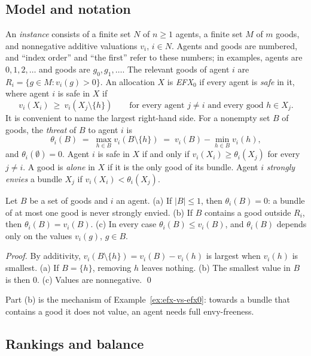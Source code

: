 \documentclass[runningheads,11pt]{llncs}
\newcommand{\efxz}{\texorpdfstring{\mbox{EFX$_0$}}{EFX0}}
\newcommand{\st}{\mathrel{:}}
\begin{document}
\subsection{Model and notation}\label{sec:model}

An \emph{instance} consists of a finite set $N$ of $n\ge1$ agents, a finite set $M$ of $m$ goods, and nonnegative additive valuations $v_i$, $i\in N$. Agents and goods are numbered, and ``index order'' and ``the first'' refer to these numbers; in examples, agents are $0,1,2,\dots$ and goods are $g_0,g_1,\dots$. The relevant goods of agent $i$ are $R_i=\{g\in M\st v_i(g)>0\}$. An allocation $X$ is \emph{\efxz{}} if every agent is \emph{safe} in it, where agent $i$ is safe in $X$ if
\[
  v_i(X_i)\ \ge\ v_i(X_j\setminus\{h\})\qquad\text{for every agent } j\ne i \text{ and every good } h\in X_j .
\]
It is convenient to name the largest right-hand side. For a nonempty set $B$ of goods, the \emph{threat} of $B$ to agent $i$ is
\[
  \theta_i(B)\;=\;\max_{h\in B} v_i(B\setminus\{h\})\;=\;v_i(B)-\min_{h\in B}v_i(h),
\]
and $\theta_i(\emptyset)=0$. Agent $i$ is safe in $X$ if and only if $v_i(X_i)\ge\theta_i(X_j)$ for every $j\ne i$. A good is \emph{alone} in $X$ if it is the only good of its bundle. Agent $i$ \emph{strongly envies} a bundle $X_j$ if $v_i(X_i)<\theta_i(X_j)$.

\begin{lemma}\label{lem:threat}
Let $B$ be a set of goods and $i$ an agent. (a) If $|B|\le1$, then $\theta_i(B)=0$: a bundle of at most one good is never strongly envied. (b) If $B$ contains a good outside $R_i$, then $\theta_i(B)=v_i(B)$. (c) In every case $\theta_i(B)\le v_i(B)$, and $\theta_i(B)$ depends only on the values $v_i(g)$, $g\in B$.
\end{lemma}

\begin{proof}
By additivity, $v_i(B\setminus\{h\})=v_i(B)-v_i(h)$ is largest when $v_i(h)$ is smallest. (a) If $B=\{h\}$, removing $h$ leaves nothing. (b) The smallest value in $B$ is then $0$. (c) Values are nonnegative. \qed
\end{proof}

\noindent Part (b) is the mechanism of Example~\ref{ex:efx-vs-efx0}: towards a bundle that contains a good it does not value, an agent needs full envy-freeness.

\subsection{Rankings and balance}\label{sec:balance}
\end{document}
